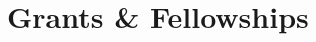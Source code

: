 \documentclass[11pt]{article} %
\begin{document}
%	


\section*{Grants \& Fellowships}
\end{document}
